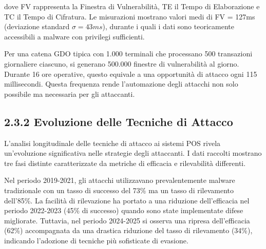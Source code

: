 dove FV rappresenta la Finestra di Vulnerabilità, TE il Tempo di
Elaborazione e TC il Tempo di Cifratura. Le misurazioni mostrano valori
medi di FV = 127ms (deviazione standard $\sigma= 43ms$), durante i quali i
dati sono teoricamente accessibili a malware con privilegi sufficienti.

Per una catena GDO tipica con 1.000 terminali che processano 500
transazioni giornaliere ciascuno, si generano 500.000 finestre di
vulnerabilità al giorno. Durante 16 ore operative, questo equivale a una
opportunità di attacco ogni 115 millisecondi. Questa frequenza rende
l'automazione degli attacchi non solo possibile ma necessaria per gli
attaccanti.

\subsection{\texorpdfstring{2.3.2 Evoluzione delle Tecniche di Attacco}{2.3.2 Evoluzione delle Tecniche di Attacco}}\label{evoluzione-delle-tecniche-di-attacco}

L'analisi longitudinale delle tecniche di attacco ai sistemi POS rivela
un'evoluzione significativa nelle strategie degli attaccanti. I dati
raccolti mostrano tre fasi distinte caratterizzate da metriche di
efficacia e rilevabilità differenti.
\begin{table}[h]
    \centering
    \label{tab:evoluzione_attacchi}
    \caption{Metriche di evoluzione degli attacchi POS 2019-2025}
\end{table}
Nel periodo 2019-2021, gli attacchi utilizzavano prevalentemente malware
tradizionale con un tasso di successo del 73\% ma un tasso di
rilevamento dell'85\%. La facilità di rilevazione ha portato a una
riduzione dell'efficacia nel periodo 2022-2023 (45\% di successo) quando
sono state implementate difese migliorate. Tuttavia, nel periodo
2024-2025 si osserva una ripresa dell'efficacia (62\%) accompagnata da
una drastica riduzione del tasso di rilevamento (34\%), indicando
l'adozione di tecniche più sofisticate di evasione.

